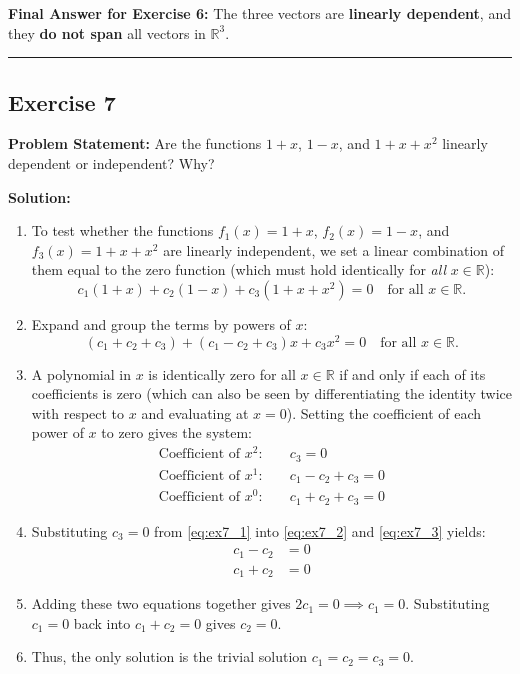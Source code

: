 \documentclass[11pt,a4paper]{article}
\begin{document}
\textbf{Final Answer for Exercise 6:} The three vectors are \textbf{linearly dependent}, and they \textbf{do not span} all vectors in $\mathbb{R}^3$.

\bigskip
\hrule
\bigskip

\subsection*{Exercise 7}
\textbf{Problem Statement:} Are the functions $1 + x$, $1 - x$, and $1 + x + x^2$ linearly dependent or independent? Why?

\textbf{Solution:}
\begin{enumerate}
    \item To test whether the functions $f_1(x) = 1 + x$, $f_2(x) = 1 - x$, and $f_3(x) = 1 + x + x^2$ are linearly independent, we set a linear combination of them equal to the zero function (which must hold identically for \emph{all} $x \in \mathbb{R}$):
    \[
        c_1(1 + x) + c_2(1 - x) + c_3(1 + x + x^2) = 0 \quad \text{for all } x \in \mathbb{R}.
    \]
    \item Expand and group the terms by powers of $x$:
    \[
        (c_1 + c_2 + c_3) + (c_1 - c_2 + c_3)x + c_3 x^2 = 0 \quad \text{for all } x \in \mathbb{R}.
    \]
    \item A polynomial in $x$ is identically zero for all $x \in \mathbb{R}$ if and only if each of its coefficients is zero (which can also be seen by differentiating the identity twice with respect to $x$ and evaluating at $x = 0$). Setting the coefficient of each power of $x$ to zero gives the system:
    \begin{align}
        \text{Coefficient of } x^2: \quad & c_3 = 0 \label{eq:ex7_1} \\
        \text{Coefficient of } x^1: \quad & c_1 - c_2 + c_3 = 0 \label{eq:ex7_2} \\
        \text{Coefficient of } x^0: \quad & c_1 + c_2 + c_3 = 0 \label{eq:ex7_3}
    \end{align}
    \item Substituting $c_3 = 0$ from \eqref{eq:ex7_1} into \eqref{eq:ex7_2} and \eqref{eq:ex7_3} yields:
    \begin{align*}
        c_1 - c_2 &= 0 \\
        c_1 + c_2 &= 0
    \end{align*}
    \item Adding these two equations together gives $2c_1 = 0 \implies c_1 = 0$. Substituting $c_1 = 0$ back into $c_1 + c_2 = 0$ gives $c_2 = 0$.
    \item Thus, the only solution is the trivial solution $c_1 = c_2 = c_3 = 0$.
\end{enumerate}
\end{document}
